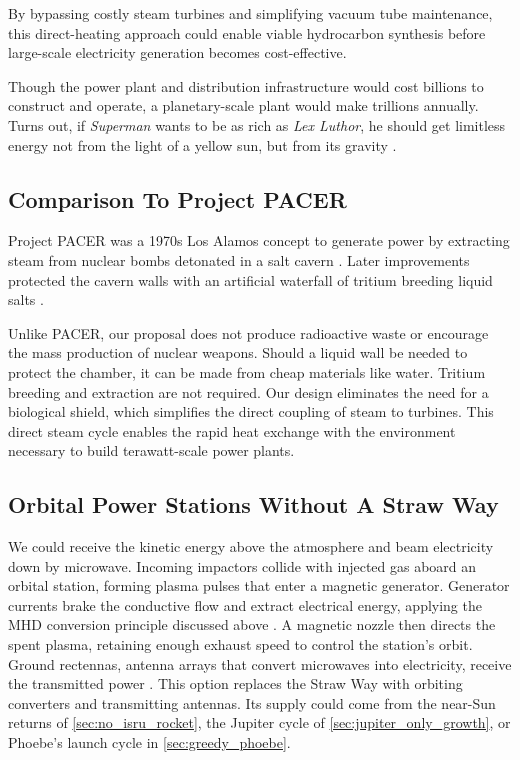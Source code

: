 \documentclass{article}
\begin{document}
By bypassing costly steam turbines and simplifying vacuum tube maintenance, this direct-heating approach could enable viable hydrocarbon synthesis before large-scale electricity generation becomes cost-effective.

Though the power plant and distribution infrastructure would cost billions to construct and operate, a planetary-scale plant would make trillions annually.  Turns out, if \textit{Superman} wants to be as rich as \textit{Lex Luthor}, he should get limitless energy not from the light of a yellow sun, but from its gravity \cite{superman2025}.

\subsection{Comparison To Project PACER}
Project PACER was a 1970s Los Alamos concept to generate power by extracting steam from nuclear bombs detonated in a salt cavern \cite{pacer_1975}.   Later improvements protected the cavern walls with an artificial waterfall of tritium breeding liquid salts \cite{pacer_revisited}.  

Unlike PACER, our proposal does not produce radioactive waste or encourage the mass production of nuclear weapons.   Should a liquid wall be needed to protect the chamber, it can be made from cheap materials like water.  Tritium breeding and extraction are not required.   Our design eliminates the need for a biological shield, which simplifies the direct coupling of steam to turbines. This direct steam cycle enables the rapid heat exchange with the environment necessary to build terawatt-scale power plants.

\subsection{Orbital Power Stations Without A Straw Way}\label{sec:orbital_kinetic_power}

We could receive the kinetic energy above the atmosphere and beam electricity down by microwave. Incoming impactors collide with injected gas aboard an orbital station, forming plasma pulses that enter a magnetic generator. Generator currents brake the conductive flow and extract electrical energy, applying the MHD conversion principle discussed above \cite{rosa1968mhd}. A magnetic nozzle then directs the spent plasma, retaining enough exhaust speed to control the station's orbit. Ground rectennas, antenna arrays that convert microwaves into electricity, receive the transmitted power \cite{malaviya2022comprehensive,space_beaming_power}. This option replaces the Straw Way with orbiting converters and transmitting antennas. Its supply could come from the near-Sun returns of \autoref{sec:no_isru_rocket}, the Jupiter cycle of \autoref{sec:jupiter_only_growth}, or Phoebe's launch cycle in \autoref{sec:greedy_phoebe}.
\end{document}
